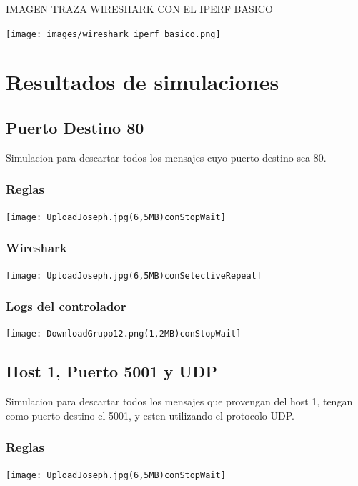 \documentclass{article}
\begin{document}
IMAGEN TRAZA WIRESHARK CON EL IPERF BASICO
\begin{center}
\texttt{[image: images/wireshark\_iperf\_basico.png]}
\end{center}


\section{\texorpdfstring{\textbf{Resultados de simulaciones}}{Resultados de simulaciones}}\label{pruebas-wip}

\subsection{Puerto Destino 80}
Simulacion para descartar todos los mensajes cuyo puerto destino sea 80.

\subsubsection{Reglas}
\begin{center}
\texttt{[image: UploadJoseph.jpg(6,5MB)conStopWait]}
\end{center}

\subsubsection{Wireshark}
\begin{center}
\texttt{[image: UploadJoseph.jpg(6,5MB)conSelectiveRepeat]}
\end{center}

\subsubsection{Logs del controlador}
\begin{center}
\texttt{[image: DownloadGrupo12.png(1,2MB)conStopWait]}
\end{center}


\subsection{Host 1, Puerto 5001 y UDP}
Simulacion para descartar todos los mensajes que provengan del host 1, tengan como puerto destino el 5001, y esten utilizando el protocolo UDP.

\subsubsection{Reglas}
\begin{center}
\texttt{[image: UploadJoseph.jpg(6,5MB)conStopWait]}
\end{center}
\end{document}
